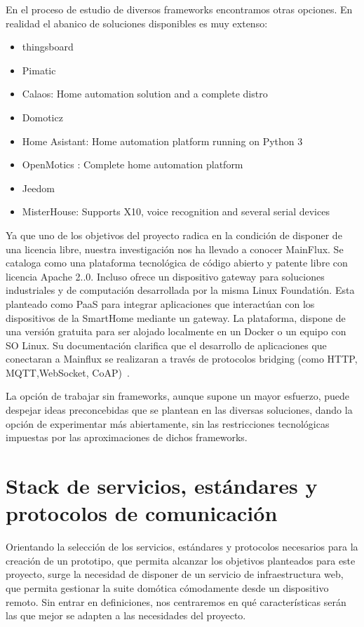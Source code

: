 \vspace{1.5cm}

En el proceso de estudio de diversos frameworks encontramos otras opciones. En realidad el abanico de soluciones disponibles es muy extenso:

\begin{itemize}
\item thingsboard
\item Pimatic
\item Calaos: Home automation solution and a complete distro
\item Domoticz
\item Home Asistant: Home automation platform running on Python 3
\item OpenMotics : Complete home automation platform
\item Jeedom
\item MisterHouse: Supports X10, voice recognition and several serial devices
\end{itemize}

Ya que uno de los objetivos del proyecto radica en la condición de disponer de una licencia libre, nuestra investigación nos ha llevado a conocer MainFlux. Se cataloga como una plataforma tecnológica de código abierto y patente libre con licencia Apache 2..0. Incluso ofrece un dispositivo gateway para soluciones industriales y de computación desarrollada por la misma Linux Foundatión. Esta planteado como PaaS para integrar aplicaciones que interactúan con los dispositivos de la SmartHome mediante un gateway. La plataforma, dispone de una versión gratuita para ser alojado localmente en un Docker o un equipo con SO Linux. Su documentación clarifica que el desarrollo de aplicaciones que conectaran a Mainflux se realizaran a través de protocolos bridging (como HTTP, MQTT,WebSocket, CoAP)~\cite{mainfluxdoc}.


La opción de trabajar sin frameworks, aunque supone un mayor esfuerzo, puede despejar ideas preconcebidas que se plantean en las diversas soluciones, dando la opción de experimentar más abiertamente, sin las restricciones tecnológicas impuestas por las aproximaciones de dichos frameworks.

\section{Stack de servicios, estándares y protocolos de comunicación}
\label{ch:Capitulo2.3}



Orientando la selección de los servicios, estándares y protocolos necesarios para la creación de un prototipo, que permita alcanzar los objetivos planteados para este proyecto, surge la necesidad de disponer de un servicio de infraestructura web, que permita gestionar la suite domótica cómodamente desde un dispositivo remoto. Sin entrar en definiciones, nos centraremos en qué características serán las que mejor se adapten a las necesidades del proyecto.

